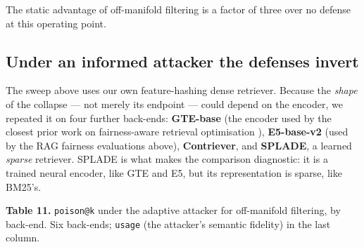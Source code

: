 \documentclass[authoryear,review,3p,times]{elsarticle}
\begin{document}
The static advantage of off-manifold filtering is a factor of three over no defense at this operating point.

\subsection{Under an informed attacker the defenses invert}\label{the-collapse-is-not-an-artefact-of-one-retriever}

The sweep above uses our own feature-hashing dense retriever. Because the \emph{shape} of the collapse --- not merely its endpoint --- could depend on the encoder, we repeated it on four further back-ends: \textbf{GTE-base} (the encoder used by the closest prior work on fairness-aware retrieval optimisation \citeyearpar{zhao2026}), \textbf{E5-base-v2} (used by the RAG fairness evaluations above), \textbf{Contriever}, and \textbf{SPLADE}, a learned \emph{sparse} retriever. SPLADE is what makes the comparison diagnostic: it is a trained neural encoder, like GTE and E5, but its representation is sparse, like BM25's.

\textbf{Table 11.} \texttt{poison@k} under the adaptive attacker for off-manifold filtering, by back-end. Six back-ends; \texttt{usage} (the attacker's semantic fidelity) in the last column.
\end{document}
